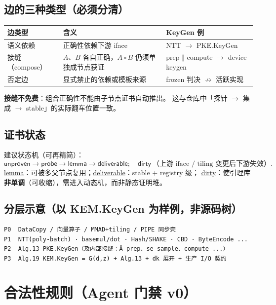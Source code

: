 \documentclass[UTF8,a4paper,11pt]{ctexart}
\begin{document}
\subsection{边的三种类型（必须分清）}
\begin{table}[h]
  \centering
  \begin{tabular}{@{}L{2.8cm}L{6.5cm}L{5.2cm}@{}}
    \toprule
    边类型 & 含义 & KeyGen 例 \\
    \midrule
    语义依赖 & 正确性依赖下游 iface & NTT $\to$ PKE.KeyGen \\
    接缝（compose） & $A$、$B$ 各自正确，$A\!\circ\!B$ 仍须单独成节点获证 & prep $\Vert$ compute $\to$ device-keygen \\
    否定边 & 显式禁止的依赖或模板来源 & frozen 判决 $\not\to$ 活跃实现 \\
    \bottomrule
  \end{tabular}
\end{table}

\textbf{接缝不免费}：组合正确性不能由子节点证书自动推出。
这与仓库中「探针 $\to$ 集成 $\to$ stable」的实际翻车位置一致。

\subsection{证书状态}
建议状态机（可再精简）：
\[
\textsf{unproven}
\to \textsf{probe}
\to \textsf{lemma}
\to \textsf{deliverable}
;\quad
\textsf{dirty}\ \text{（上游 iface / tiling 变更后下游失效）}.
\]
\underline{lemma}：可被多父节点复用；\underline{deliverable}：stable + registry 级；
\underline{dirty}：使引理库\textbf{非单调}（可收缩），需进入动态机，而非静态证明堆。

\subsection{分层示意（以 KEM.KeyGen 为样例，非源码树）}
\begin{lstlisting}
P0  DataCopy / 向量算子 / MMAD+tiling / PIPE 同步壳
P1  NTT(poly-batch) · basemul/dot · Hash/SHAKE · CBD · ByteEncode ...
P2  Alg.13 PKE.KeyGen（及内部接缝：Â prep、se sample、compute ...）
P3  Alg.19 KEM.KeyGen = G(d,z) + Alg.13 + dk 展开 + 生产 I/O 契约
\end{lstlisting}

\section{合法性规则（Agent 门禁 v0）}
\end{document}
